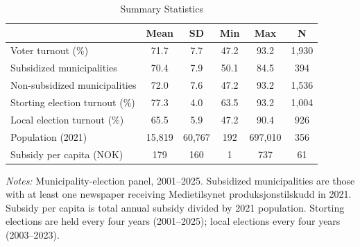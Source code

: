 \begin{table}[htbp]
\centering
\caption{Summary Statistics}
\label{tab:summary}
\begin{tabular}{lccccc}
\hline\hline
 & Mean & SD & Min & Max & N \\
\hline
Voter turnout (\%) & 71.7 & 7.7 & 47.2 & 93.2 & 1,930 \\
\quad Subsidized municipalities & 70.4 & 7.9 & 50.1 & 84.5 & 394 \\
\quad Non-subsidized municipalities & 72.0 & 7.6 & 47.2 & 93.2 & 1,536 \\
Storting election turnout (\%) & 77.3 & 4.0 & 63.5 & 93.2 & 1,004 \\
Local election turnout (\%) & 65.5 & 5.9 & 47.2 & 90.4 & 926 \\
Population (2021) & 15,819 & 60,767 & 192 & 697,010 & 356 \\
Subsidy per capita (NOK) & 179 & 160 & 1 & 737 & 61 \\
\hline\hline
\end{tabular}
\begin{tablenotes}
\item \textit{Notes:} Municipality-election panel, 2001--2025. Subsidized municipalities are those with at least one newspaper receiving Medietilsynet produksjonstilskudd in 2021. Subsidy per capita is total annual subsidy divided by 2021 population. Storting elections are held every four years (2001--2025); local elections every four years (2003--2023).
\end{tablenotes}
\end{table}

